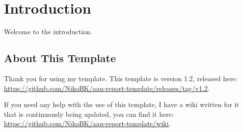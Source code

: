 \chapter{Introduction}
Welcome to the introduction.

\section{About This Template}
Thank you for using my template. This template is version 1.2, released here:
\url{https://github.com/NikoBK/aau-report-template/releases/tag/v1.2}.\n

\noindent
If you need any help with the use of this template, I have a wiki written for it that is continuously being updated, you can find it here:\\
\url{https://github.com/NikoBK/aau-report-template/wiki}.